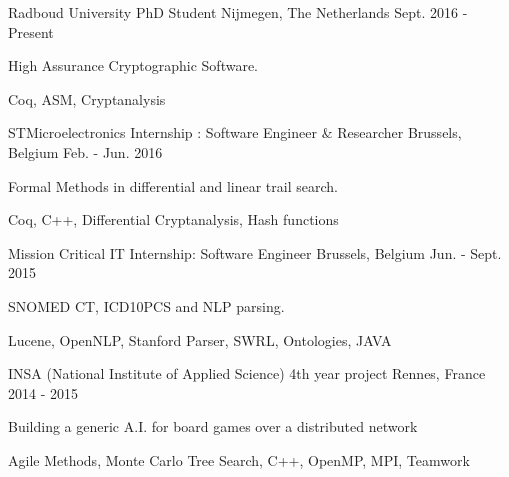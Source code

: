 

\begin{cventries}

  \cventrysix%
    {Radboud University} %
    {PhD Student} %
    {Nijmegen, The Netherlands} %
    {Sept. 2016 - Present} %
    {
      \begin{cvitems} %
        \item {High Assurance Cryptographic Software.} %
      \end{cvitems}
    }%
    {Coq, ASM, Cryptanalysis}%

  \cventrysix%
    {STMicroelectronics} %
    {Internship : Software Engineer \& Researcher} %
    {Brussels, Belgium} %
    {Feb. - Jun. 2016} %
    {
      \begin{cvitems} %
        \item {Formal Methods in differential and linear trail search.} %
      \end{cvitems}
    }%
    {Coq, C++, Differential Cryptanalysis, Hash functions}%

  \cventrysix%
    {Mission Critical IT} %
    {Internship: Software Engineer} %
    {Brussels, Belgium} %
    {Jun. - Sept. 2015} %
    {
      \begin{cvitems} %
        \item {SNOMED CT, ICD10PCS and NLP parsing.}
      \end{cvitems}
    }%
    {Lucene, OpenNLP, Stanford Parser, SWRL, Ontologies, JAVA}%

  \cventrysix
    {INSA (National Institute of Applied Science)} %
    {4th year project} %
    {Rennes, France} %
    {2014 - 2015} %
    {
      \begin{cvitems} %
        \item {Building a generic A.I. for board games over a distributed network}
      \end{cvitems}
    }%
    {Agile Methods, Monte Carlo Tree Search, C++, OpenMP, MPI, Teamwork}


\end{cventries}
